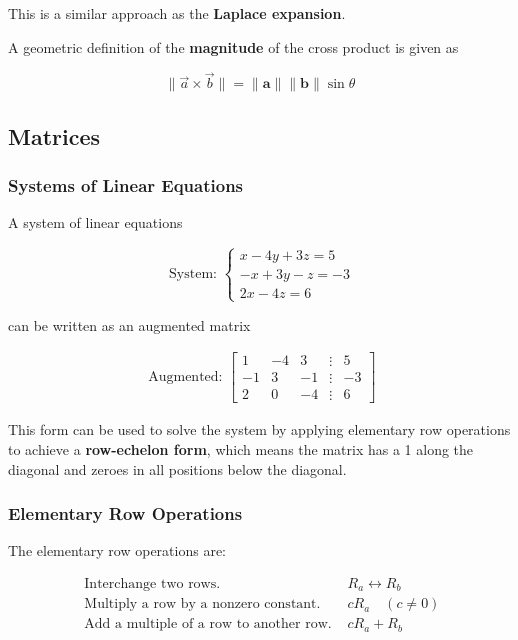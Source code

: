 This is a similar approach as the \textbf{Laplace expansion}.

A geometric definition of the \textbf{magnitude} of the cross product is given as

\begin{equation}
	\|\vec{a} \times \vec{b}\|=\|\mathbf{a}\| \|\mathbf{b}\| \sin \theta
\end{equation}

\subsection{Matrices}
\subsubsection{Systems of Linear Equations}
A system of linear equations

\begin{equation}
	\text { System: }\left \{\begin{array}{r}{x-4 y+3 z=5} \\ {-x+3 y-z=-3} \\ {2 x-4 z=6}\end{array}\right.
\end{equation}

can be written as an augmented matrix

\begin{equation}
	\begin{array}{l}{\text { Augmented: }\left[\begin{array}{rrrrr}{1} & {-4} & {3} & {\vdots} & {5} \\ {-1} & {3} & {-1} & {\vdots} & {-3} \\ {2} & {0} & {-4} & {\vdots} & {6}\end{array}\right]}\end{array}
\end{equation}

This form can be used to solve the system by applying elementary row operations to achieve a \textbf{row-echelon form}, which means the matrix has a 1 along the diagonal and zeroes in all positions below the diagonal.

\subsubsection{Elementary Row Operations}
The elementary row operations are:

\begin{equation}
	\begin{array}{ll}{\text { Interchange two rows. }} & {R_{a} \leftrightarrow R_{b}} \\ {\text { Multiply a row by a nonzero constant. }} & {c R_{a} \quad(c \neq 0)} \\ {\text { Add a multiple of a row to another row. }} & {c R_{a}+R_{b}}\end{array}
\end{equation}


